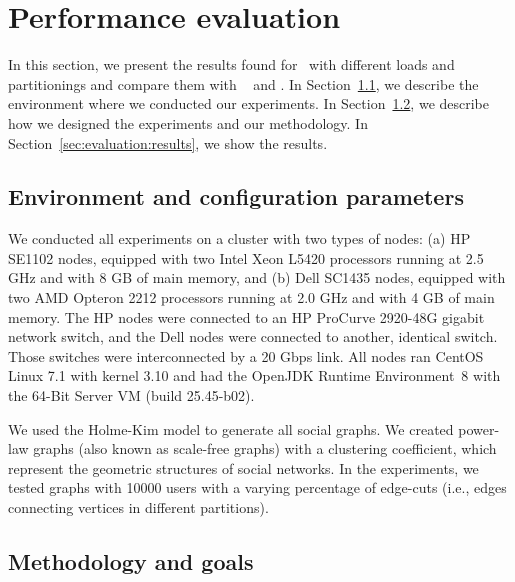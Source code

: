 \section{Performance evaluation}
\label{sec:experiments}

In this section, we present the results found for \appname\ with different loads and partitionings and compare them with
\ssmr{}~\cite{bezerra2014ssmr} and \dssmr.
In Section~\ref{sec:evaluation:setup}, we describe the environment where we conducted our experiments.
In Section~\ref{sec:evaluation:methodology}, we describe how we designed the experiments and our methodology.
In Section~\ref{sec:evaluation:results}, we show the results.

\subsection{Environment and configuration parameters}
\label{sec:evaluation:setup}

We conducted all experiments on a cluster with two types of nodes: (a) HP SE1102 nodes, equipped with two Intel Xeon L5420 processors running at 2.5 GHz and with 8 GB of main memory, and (b) Dell SC1435 nodes, equipped with two AMD Opteron 2212 processors running at 2.0 GHz and with 4 GB of main memory. The HP nodes were connected to an HP ProCurve 2920-48G gigabit network switch, and the Dell nodes were connected to another, identical switch. Those switches were interconnected by a 20 Gbps link.
All nodes ran CentOS Linux 7.1 with kernel 3.10 and had the OpenJDK Runtime Environment~8 with the \mbox{64-Bit} Server VM (build 25.45-b02).

We used the Holme-Kim model \cite{holme-kim} to generate all social graphs.
We created power-law graphs (also known as scale-free graphs) with a clustering coefficient, which represent the geometric structures of social networks.
In the experiments, we tested graphs with 10000 users with a varying percentage of edge-cuts (i.e., edges connecting vertices in different partitions).

\subsection{Methodology and goals}
\label{sec:evaluation:methodology}

